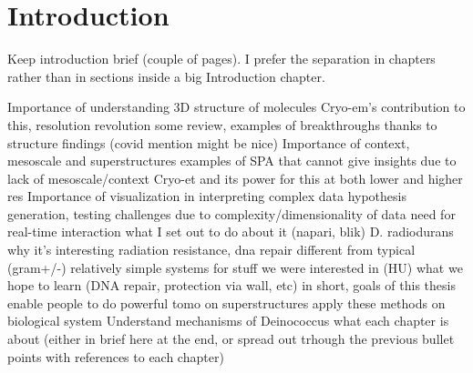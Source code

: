 \chapter{Introduction}\label{introduction}

Keep introduction brief (couple of pages). I prefer the separation in chapters rather than in sections inside a big Introduction chapter.

\begin{outline}
\1 Importance of understanding 3D structure of molecules
    \2 Cryo-em's contribution to this, resolution revolution
    \2 some review, examples of breakthroughs thanks to structure findings (covid mention might be nice)
\1 Importance of context, mesoscale and superstructures
    \2 examples of SPA that cannot give insights due to lack of mesoscale/context
    \2 Cryo-et and its power for this at both lower and higher res
\1 Importance of visualization in interpreting complex data
    \2 hypothesis generation, testing
    \2 challenges due to complexity/dimensionality of data
    \2 need for real-time interaction
    \2 what I set out to do about it (napari, blik)
\1 D. radiodurans
    \2 why it's interesting
        \3 radiation resistance, dna repair
        \3 different from typical (gram+/-)
        \3 relatively simple systems for stuff we were interested in (HU)
    \2 what we hope to learn (DNA repair, protection via wall, etc)
\1 in short, goals of this thesis
    \2 enable people to do powerful tomo on superstructures
    \2 apply these methods on biological system
    \2 Understand mechanisms of Deinococcus
\1 what each chapter is about (either in brief here at the end, or spread out trhough the previous bullet points with references to each chapter)
\end{outline}
